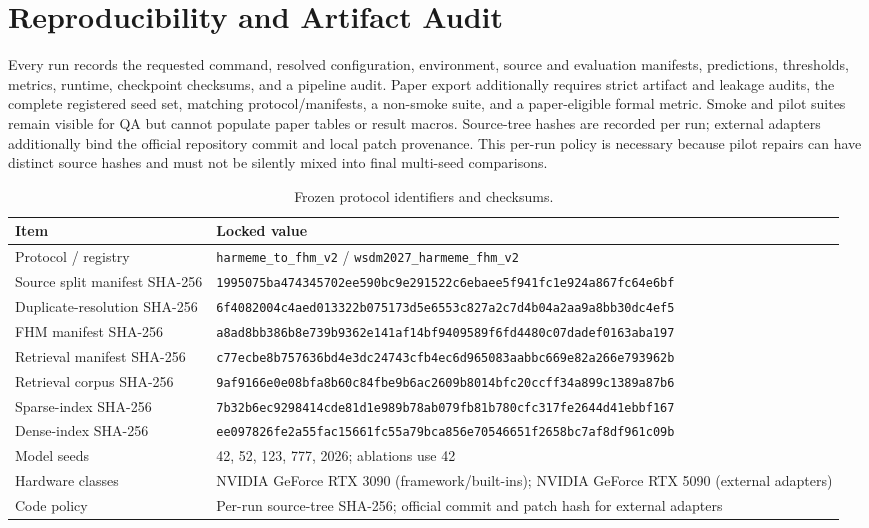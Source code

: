 \section{Reproducibility and Artifact Audit}
\label{sec:supp:reproducibility}

Every run records the requested command, resolved configuration, environment,
source and evaluation manifests, predictions, thresholds, metrics, runtime,
checkpoint checksums, and a pipeline audit.  Paper export additionally
requires strict artifact and leakage audits, the complete registered seed set,
matching protocol/manifests, a non-smoke suite, and a paper-eligible formal
metric.  Smoke and pilot suites remain visible for QA but cannot populate
paper tables or result macros.  Source-tree hashes are recorded per run;
external adapters additionally bind the official repository commit and local
patch provenance.  This per-run policy is necessary because pilot repairs can
have distinct source hashes and must not be silently mixed into final
multi-seed comparisons.

\begin{table}[t]
  \caption{Frozen protocol identifiers and checksums.}
  \label{tab:supp:hashes}
  \centering
  \small
  \begin{tabular}{@{}p{}p{}@{}}
    \toprule
    Item & Locked value \\
    \midrule
    Protocol / registry & \texttt{harmeme\_to\_fhm\_v2} / \texttt{wsdm2027\_harmeme\_fhm\_v2} \\
    Source split manifest SHA-256 & \nolinkurl{1995075ba474345702ee590bc9e291522c6ebaee5f941fc1e924a867fc64e6bf} \\
    Duplicate-resolution SHA-256 & \nolinkurl{6f4082004c4aed013322b075173d5e6553c827a2c7d4b04a2aa9a8bb30dc4ef5} \\
    FHM manifest SHA-256 & \nolinkurl{a8ad8bb386b8e739b9362e141af14bf9409589f6fd4480c07dadef0163aba197} \\
    Retrieval manifest SHA-256 & \nolinkurl{c77ecbe8b757636bd4e3dc24743cfb4ec6d965083aabbc669e82a266e793962b} \\
    Retrieval corpus SHA-256 & \nolinkurl{9af9166e0e08bfa8b60c84fbe9b6ac2609b8014bfc20ccff34a899c1389a87b6} \\
    Sparse-index SHA-256 & \nolinkurl{7b32b6ec9298414cde81d1e989b78ab079fb81b780cfc317fe2644d41ebbf167} \\
    Dense-index SHA-256 & \nolinkurl{ee097826fe2a55fac15661fc55a79bca856e70546651f2658bc7af8df961c09b} \\
    Model seeds & 42, 52, 123, 777, 2026; ablations use 42 \\
    Hardware classes & NVIDIA GeForce RTX 3090 (framework/built-ins); NVIDIA GeForce RTX 5090 (external adapters) \\
    Code policy & Per-run source-tree SHA-256; official commit and patch hash for external adapters \\
    \bottomrule
  \end{tabular}
\end{table}


